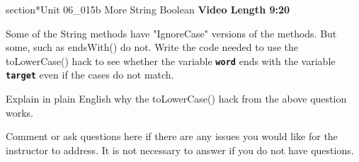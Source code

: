 \documentclass[letterpaper,12pt]{exam}
\newcommand{\unit}{Unit 06}
\begin{document}
\begin{questions}
section*{\unit\_015b More String Boolean } %
\noindent \textbf{Video Length 9:20}

\begin{samepage}
    \question Some of the String methods have "IgnoreCase" versions of the methods.  But some, such as endsWith() do not.  Write the code needed to use the toLowerCase() hack to see whether the variable \texttt{\textbf{word}} ends with the variable \texttt{\textbf{target}} even if the cases do not match.
    \vspace{5mm}
\end{samepage}

\begin{samepage}
    \question Explain in plain English why the toLowerCase() hack from the above question works.
    \vspace{5mm}
\end{samepage}




\begin{samepage}
	\question Comment or ask questions here if there are any issues you would like for the instructor to address.  It is not necessary to answer if you do not have questions.
	\vspace{30mm}
\end{samepage}

\end{questions}
\end{document}
